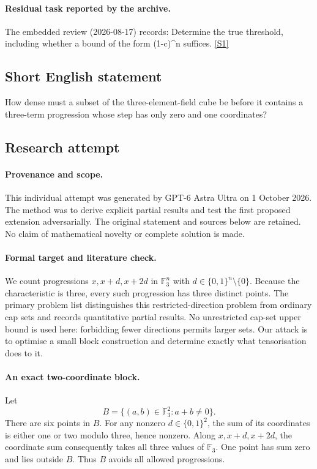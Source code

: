 \documentclass[11pt,a4paper]{article}
\newcommand{\F}{\mathbb{F}}
\newcommand{\sref}[2]{\hyperlink{source:#1:#2}{[S#2]}}
\begin{document}
\paragraph{Residual task reported by the archive.}

The embedded review (2026-08-17) records: Determine the true threshold, including whether a bound of the form (1-c)\textasciicircum{}n suffices. \sref{106}{1}

\subsection{Short English statement}

How dense must a subset of the three-element-field cube be before it contains a three-term progression whose step has only zero and one coordinates?

\subsection{Research attempt}

\paragraph{Provenance and scope.}
This individual attempt was generated by GPT-6 Astra Ultra on 1 October 2026. The method was to derive explicit partial results and test the first proposed extension adversarially. The original statement and sources below are retained. No claim of mathematical novelty or complete solution is made.

\paragraph{Formal target and literature check.}
We count progressions $x,x+d,x+2d$ in $\F_3^n$ with $d\in\{0,1\}^n\setminus\{0\}$. Because the characteristic is three, every such progression has three distinct points. The primary problem list distinguishes this restricted-direction problem from ordinary cap sets and records quantitative partial results. No unrestricted cap-set upper bound is used here: forbidding fewer directions permits larger sets. Our attack is to optimise a small block construction and determine exactly what tensorisation does to it.

\paragraph{An exact two-coordinate block.}
Let
\[
 B=\{(a,b)\in\F_3^2:a+b\ne0\}.
\]
There are six points in $B$. For any nonzero $d\in\{0,1\}^2$, the sum of its coordinates is either one or two modulo three, hence nonzero. Along $x,x+d,x+2d$, the coordinate sum consequently takes all three values of $\F_3$. One point has sum zero and lies outside $B$. Thus $B$ avoids all allowed progressions.
\end{document}
